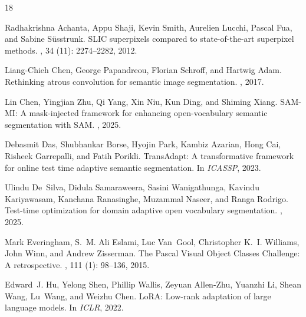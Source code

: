 \documentclass{article}
\begin{document}

\begin{thebibliography}{18}

Radhakrishna Achanta, Appu Shaji, Kevin Smith, Aurelien Lucchi, Pascal Fua,
  and Sabine S{\"u}sstrunk.
\newblock SLIC superpixels compared to state-of-the-art superpixel methods.
,
  34 (11): 2274--2282, 2012.

Liang-Chieh Chen, George Papandreou, Florian Schroff, and Hartwig Adam.
\newblock Rethinking atrous convolution for semantic image segmentation.
, 2017.

Lin Chen, Yingjian Zhu, Qi Yang, Xin Niu, Kun Ding, and Shiming Xiang.
\newblock SAM-MI: A mask-injected framework for enhancing open-vocabulary
  semantic segmentation with SAM.
, 2025.

Debasmit Das, Shubhankar Borse, Hyojin Park, Kambiz Azarian, Hong Cai, Risheek
  Garrepalli, and Fatih Porikli.
\newblock TransAdapt: A transformative framework for online test time adaptive
  semantic segmentation.
\newblock In {\em ICASSP}, 2023.

Ulindu De~Silva, Didula Samaraweera, Sasini Wanigathunga, Kavindu
  Kariyawasam, Kanchana Ranasinghe, Muzammal Naseer, and Ranga Rodrigo.
\newblock Test-time optimization for domain adaptive open vocabulary
  segmentation.
, 2025.

Mark Everingham, S.~M. Ali Eslami, Luc Van~Gool, Christopher K.~I. Williams,
  John Winn, and Andrew Zisserman.
\newblock The Pascal Visual Object Classes Challenge: A retrospective.
, 111
  (1): 98--136, 2015.

Edward~J. Hu, Yelong Shen, Phillip Wallis, Zeyuan Allen-Zhu, Yuanzhi Li,
  Shean Wang, Lu~Wang, and Weizhu Chen.
\newblock LoRA: Low-rank adaptation of large language models.
\newblock In {\em ICLR}, 2022.


\end{thebibliography}
\end{document}
